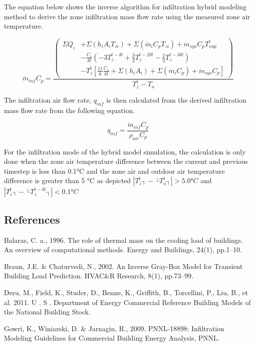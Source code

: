 The equation below shows the inverse algorithm for infiltration hybrid modeling method to derive the zone infiltration mass flow rate using the measured zone air temperature.

\begin{equation}
\dot{m}_{inf} C_p = \frac {\left(\begin{aligned}\Sigma Q_i &+ \Sigma (h_i A_i T_{si}) + \Sigma (\dot{m}_i C_p T_{zi}) + \dot{m}_{sys} C_p T_{sup}^t\\ &- \frac {C_z} {\delta t} \left(-3T_z^{t-\delta t} + \frac {3} {2} T_z^{t-2\delta t} - \frac {1} {3} T_z^{t-3\delta t}\right)\\ &- T_z^t \left[ \frac {11} {6} \frac {C_z} {\delta t} + \Sigma (h_i A_i) + \Sigma (\dot{m}_i C_p) + \dot{m}_{sys} C_p\right]\end{aligned}\right)} {T_z^t - T_o}
\end{equation}

The infiltration air flow rate, $q_{inf}$ is then calculated from the derived infiltration mass flow rate from the following equation.

\begin{equation}
q_{inf}= \frac {\dot{m}_{inf} C_p} {ρ_{air} C_p}
\end{equation}

For the infiltration mode of the hybrid model simulation, the calculation is only done when the zone air temperature difference between the current and previous timestep is less than 0.1°C and the zone air and outdoor air temperature difference is greater than 5 °C as depicted $|T_z^t ┤-├ T_o^t ┤|>5.0 °C$ and $|T_z^t ┤-├ T_z^{t-\delta t} ┤|<0.1°C$

\subsection{References}\label{references}

Balaras, C. a., 1996. The role of thermal mass on the cooling load of buildings. An overview of computational methods. Energy and Buildings, 24(1), pp.1–10.

Braun, J.E. \& Chaturvedi, N., 2002. An Inverse Gray-Box Model for Transient Building Load Prediction. HVAC\&R Research, 8(1), pp.73–99.

Deru, M., Field, K., Studer, D., Benne, K., Griffith, B., Torcellini, P., Liu, B., et al. 2011. U . S . Department of Energy Commercial Reference Building Models of the National Building Stock.

Gowri, K., Winiarski, D. \& Jarnagin, R., 2009. PNNL-18898: Infiltration Modeling Guidelines for Commercial Building Energy Analysis, PNNL.

